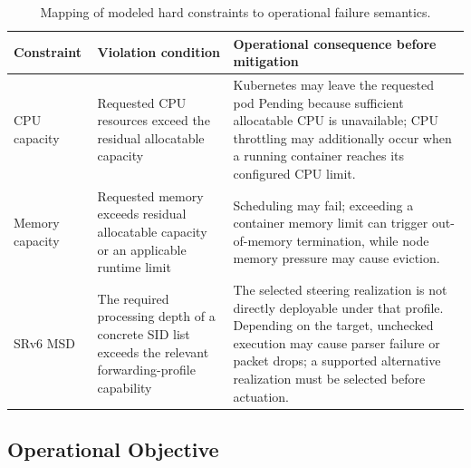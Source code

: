 \documentclass[final,5p]{elsarticle}
\newcommand{\rev}[1]{\textcolor{revisiongreen}{#1}}
\begin{document}
\begin{table}[!tb]
\centering
\caption{\rev{Mapping of modeled hard constraints to operational failure semantics.}}
\label{tab:hard_constraint_failure_mapping}
\renewcommand{\arraystretch}{1.15}
\small
\begin{tabularx}{\textwidth}{p{2.6cm}p{4.0cm}X}
\toprule
\rev{\textbf{Constraint}} & \rev{\textbf{Violation condition}} & \rev{\textbf{Operational consequence before mitigation}} \\
\midrule
\rev{CPU capacity} & \rev{Requested CPU resources exceed the residual allocatable capacity} & \rev{Kubernetes may leave the requested pod Pending because sufficient allocatable CPU is unavailable; CPU throttling may additionally occur when a running container reaches its configured CPU limit.} \\
\rev{Memory capacity} & \rev{Requested memory exceeds residual allocatable capacity or an applicable runtime limit} & \rev{Scheduling may fail; exceeding a container memory limit can trigger out-of-memory termination, while node memory pressure may cause eviction.} \\
\rev{SRv6 MSD} & \rev{The required processing depth of a concrete SID list exceeds the relevant forwarding-profile capability} & \rev{The selected steering realization is not directly deployable under that profile. Depending on the target, unchecked execution may cause parser failure or packet drops; a supported alternative realization must be selected before actuation.} \\
\bottomrule
\end{tabularx}
\end{table}

\subsection{Operational Objective}
\label{subsec:objective_metrics}
\end{document}

